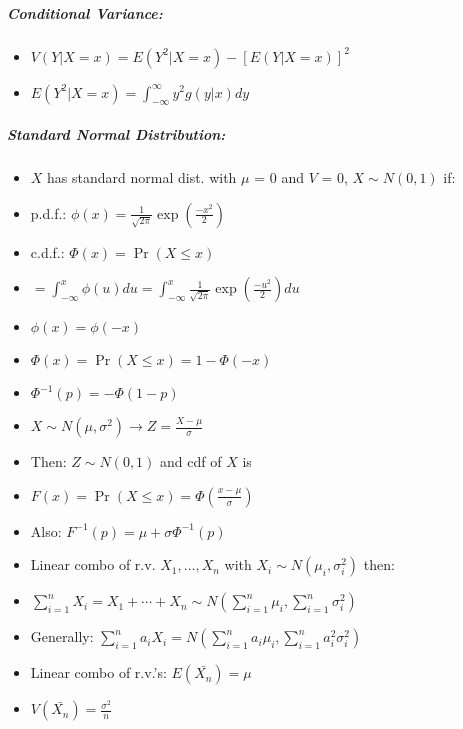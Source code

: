 \documentclass[landscape,10pt]{article}
\begin{document}
\begin{multicols}{4}
\subparagraph*{Conditional Variance: }
\begin{itemize}
    \item[] \(V(Y|X=x) = E(Y^2|X=x) - [E(Y|X=x)]^2\)
    \item[] \(E(Y^2|X=x) = \int_{-\infty}^{\infty}{y^2 g(y|x) dy}\)
\end{itemize}

\subparagraph*{Standard Normal Distribution:}
\begin{itemize}
    \item[] \(X\) has standard normal dist. with \(\mu\) = 0 and \(V\) = 0, \(X \sim N(0,1)\) if:
    \item[] p.d.f.: \( \phi(x) = \frac{1}{\sqrt{2 \pi}}\exp\left (\frac{-x^2}{2}\right)\)
    \item[] c.d.f.: \( 
        \Phi(x) = \Pr(X \leq x) \)
    \item[] \(= \int_{-\infty}^{x}{\phi(u)du}= \int_{-\infty}^{x}{\frac{1}{\sqrt{2 \pi}} \exp\left(\frac{-u^2}{2}\right)du}\)
    \item[] \(\phi(x) = \phi(-x)\)
    \item[] \(\Phi(x) = \Pr(X \leq x) = 1 - \Phi(-x)\)
    \item[] \(\Phi^{-1}(p) = -\Phi(1-p)\)
    \item[] \(X \sim N(\mu, \sigma^2) \rightarrow Z = \frac{X-\mu}{\sigma}\)
    \item[] Then: \(Z \sim N(0,1)\) and cdf of \(X\) is
    \item[] \(F(x) = \Pr(X \leq x) = \Phi(\frac{x-\mu}{\sigma})\)
    \item[] Also: \(F^{-1}(p) = \mu + \sigma \Phi^{-1}(p)\)
    \item[] Linear combo of r.v. \(X_1, \ldots, X_n\) with \(X_i \sim N(\mu_i, \sigma_i^2)\) then:
    \item[] \(\sum\limits_{i = 1}^{n}{X_i} = X_1 + \cdots + X_n \sim N(\sum\limits_{i = 1}^{n} \mu_i, \sum\limits_{i = 1}^{n} \sigma_i^2)\)
    \item[] Generally: \(\sum\limits_{i = 1}^{n}{a_i X_i} = N(\sum\limits_{i = 1}^{n}{a_i \mu_i}, \sum\limits_{i = 1}^{n}{a_i^2 \sigma_i^2})\)
    \item[] Linear combo of r.v.'s: \(E(\bar{X_n}) =  \mu\)
    \item[] \(V(\bar{X_n}) = \frac{\sigma^2}{n}\)
\end{itemize}


\end{multicols}
\end{document}

